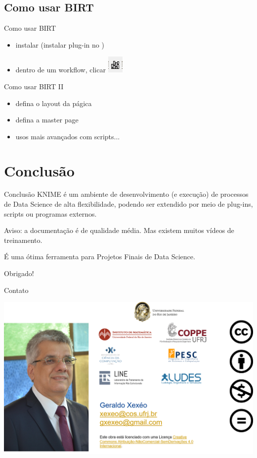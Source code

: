 \documentclass{beamer}
\begin{document}
\subsection{Como usar BIRT}
\begin{frame}{Como usar BIRT}
    \begin{itemize}
        \item instalar (instalar plug-in no )
        \item dentro de um workflow, clicar \includegraphics{Images/birticon.png}
    \end{itemize}
\end{frame}

\begin{frame}{Como usar BIRT II}
    \begin{itemize}
        \item defina o layout da págica
        \item defina a master page
        \item usos mais avançados com scripts...
    \end{itemize}
\end{frame}

\section{Conclusão}
\begin{frame}{Conclusão}
    KNIME é um ambiente de desenvolvimento (e execução) de processos de Data Science de alta flexibilidade, podendo ser extendido por meio de plug-ins, scripts ou programas externos.
    
    Aviso: a documentação é de qualidade média. Mas existem muitos vídeos de treinamento.
    
    É uma ótima ferramenta para Projetos Finais de Data Science.
  
\end{frame} 



\begin{frame}
    \Huge \center
    Obrigado!
\end{frame} 





\begin{frame}{Contato}
    \begin{center}
        \includegraphics[width=\linewidth]{Images/Picture5.png}
    \end{center}   
\end{frame}
\end{document}
